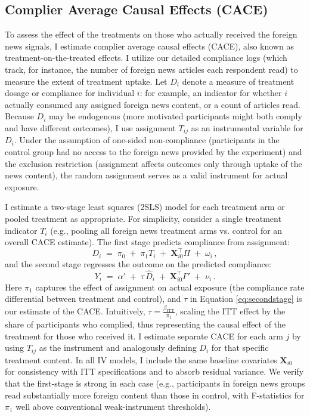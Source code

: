 \documentclass[12pt, american]{article}
\begin{document}
\subsection{Complier Average Causal Effects (CACE)}
To assess the effect of the treatments on those who actually received the foreign news signals, I estimate complier average causal effects (CACE), also known as treatment-on-the-treated effects. I utilize our detailed compliance logs (which track, for instance, the number of foreign news articles each respondent read) to measure the extent of treatment uptake. Let $D_{i}$ denote a measure of treatment dosage or compliance for individual $i$: for example, an indicator for whether $i$ actually consumed any assigned foreign news content, or a count of articles read. Because $D_{i}$ may be endogenous (more motivated participants might both comply and have different outcomes), I use assignment $T_{ij}$ as an instrumental variable for $D_{i}$. Under the assumption of one-sided non-compliance (participants in the control group had no access to the foreign news provided by the experiment) and the exclusion restriction (assignment affects outcomes only through uptake of the news content), the random assignment serves as a valid instrument for actual exposure. 

I estimate a two-stage least squares (2SLS) model for each treatment arm or pooled treatment as appropriate. For simplicity, consider a single treatment indicator $T_i$ (e.g., pooling all foreign news treatment arms vs. control for an overall CACE estimate). The first stage predicts compliance from assignment:
\begin{equation}\label{eq:firststage}
D_{i} \;=\; \pi_{0} \;+\; \pi_{1} T_{i} \;+\; \mathbf{X}_{i0}^{\top}\Pi \;+\; \omega_{i}\,,
\end{equation}
and the second stage regresses the outcome on the predicted compliance:
\begin{equation}\label{eq:secondstage}
Y_{i} \;=\; \alpha' \;+\; \tau \,\widehat{D}_{i} \;+\; \mathbf{X}_{i0}^{\top}\Gamma' \;+\; \nu_{i}\,.
\end{equation}
Here $\pi_{1}$ captures the effect of assignment on actual exposure (the compliance rate differential between treatment and control), and $\tau$ in Equation \eqref{eq:secondstage} is our estimate of the CACE. Intuitively, $\tau = \frac{\beta_{\text{ITT}}}{\pi_1}$, scaling the ITT effect by the share of participants who complied, thus representing the causal effect of the treatment for those who received it. I estimate separate CACE for each arm $j$ by using $T_{ij}$ as the instrument and analogously defining $D_{i}$ for that specific treatment content. In all IV models, I include the same baseline covariates $\mathbf{X}_{i0}$ for consistency with ITT specifications and to absorb residual variance. We verify that the first-stage is strong in each case (e.g., participants in foreign news groups read substantially more foreign content than those in control, with F-statistics for $\pi_1$ well above conventional weak-instrument thresholds).
\end{document}
